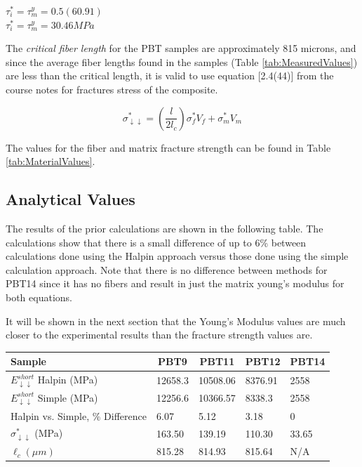 \documentclass[11pt]{article}
\begin{document}
\begin{center}

\(\tau^*_i = \tau^y_m = 0.5(60.91)\)
\\
\(\tau^*_i = \tau^y_m = 30.46 MPa\)

\end{center}

The \textit{critical fiber length} for the PBT samples are approximately 815 microns, and since the average fiber lengths found in the samples (Table \ref{tab:MeasuredValues}) are less than the critical length, it is valid to use equation [2.4(44)] from the course notes \cite{course_notes} for fractures stress of the composite. 

\begin{equation} \label{eq:fracture}
\sigma^*_{\downarrow \downarrow} = \left( \frac{l}{2l_c}\right) \sigma_f^* V_f + \sigma^*_m V_m
\end{equation}

The values for the fiber and matrix fracture strength can be found in Table \ref{tab:MaterialValues}.

\subsection{Analytical Values}

The results of the prior calculations are shown in the following table. The calculations show that there is a small difference of up to 6\% between calculations done using the Halpin approach versus those done using the simple calculation approach. Note that there is no difference between methods for PBT14 since it has no fibers and result in just the matrix young's modulus for both equations.

It will be shown in the next section that the Young's Modulus values are much closer to the experimental results than the fracture strength values are.
\newpage
\begin{center}
 \label{tab:CalculatedValues}
\begin{tabular}{p{3.5cm} || p{} | p{} | p{} | p{}}
\hline
Sample & \multicolumn{1}{c|}{PBT9} & \multicolumn{1}{c|}{PBT11} & \multicolumn{1}{c|}{PBT12} & \multicolumn{1}{c}{PBT14} \\
\hline
\hline
\(E^{short}_{\downarrow \downarrow}\) Halpin (MPa)& 12658.3 &  10508.06 & 8376.91 & 2558\\
\(E^{short}_{\downarrow \downarrow}\) Simple (MPa)& 12256.6 & 10366.57 & 8338.3 & 2558\\
\hline
Halpin vs. Simple, \% Difference & 6.07 & 5.12 & 3.18 & 0\\
\hline
\(\sigma^*_{\downarrow \downarrow}\) (MPa)& 163.50 & 139.19 & 110.30 & 33.65\\
\(\ell_c (\mu m) \) & 815.28 & 814.93 & 815.64 & N/A\\
\hline

\end{tabular}
\end{center}
\singlespacing
\end{document}
